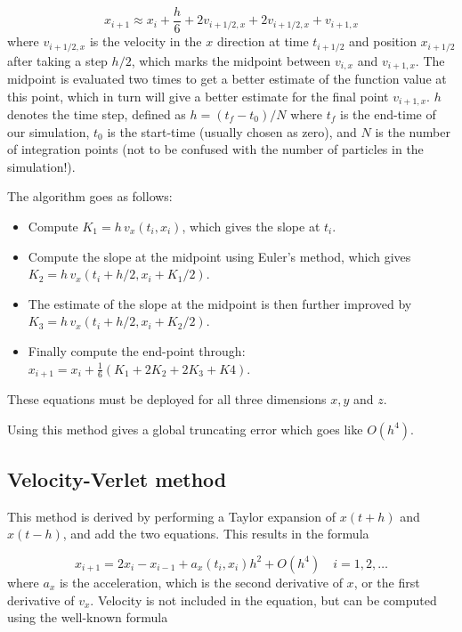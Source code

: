 \documentclass{article}
\begin{document}
\begin{multicols}{2}
\begin{equation}
	x_{i+1} \approx x_i + \frac{h}{6} + 2 v_{i + 1/2,x} + 2 v_{i + 1/2,x} + v_{i+1,x}
\end{equation}
where $v_{i + 1/2,x} $ is the velocity in the $x$ direction at time $t_{i + 1/2}$ and position $x_{i + 1/2}$ after taking a step $h/2$, which marks the midpoint between $v_{i,x}$ and $v_{i+1,x}$. The midpoint is evaluated two times to get a better estimate of the function value at this point, which in turn will give a better estimate for the final point $v_{i+1,x}$. $h$ denotes the time step, defined as $h = (t_f - t_0)/N$ where $t_f$ is the end-time of our simulation, $t_0$ is the start-time (usually chosen as zero), and $N$ is the number of integration points (not to be confused with the number of particles in the simulation!).

The algorithm goes as follows:

\begin{itemize}
	\item Compute $K_1 = h \, v_x(t_i,x_i)$, which gives the slope at $t_i$.
	\item Compute the slope at the midpoint using Euler's method, which gives $K_2 = h \, v_x(t_i + h/2, x_i + K_1/2)$.
	\item The estimate of the slope at the midpoint is then further improved by $K_3 = h \, v_x(t_i + h/2, x_i + K_2/2)$.
	\item Finally compute the end-point through: \\ $x_{i+1} = x_i + \frac{1}{6}(K_1 + 2K_2 + 2K_3 + K4)$.
\end{itemize}
These equations must be deployed for all three dimensions $x,y$ and $z$.

Using this method gives a global truncating error which goes like $O(h^4)$. 




\subsection{Velocity-Verlet method}\label{sec:VV}
This method is derived by performing a Taylor expansion of $x(t+h)$ and $x(t-h)$, and add the two equations. This results in the formula

\begin{equation}\label{eq:verlet}
	x_{i+1} = 2x_i - x_{i-1} + a_x(t_i,x_i)h^2 + O(h^4) \quad i = 1, 2, \dots
\end{equation}
where $a_x$ is the acceleration, which is the second derivative of $x$, or the first derivative of $v_x$. Velocity is not included in the equation, but can be computed using the well-known formula


\end{multicols}
\end{document}
